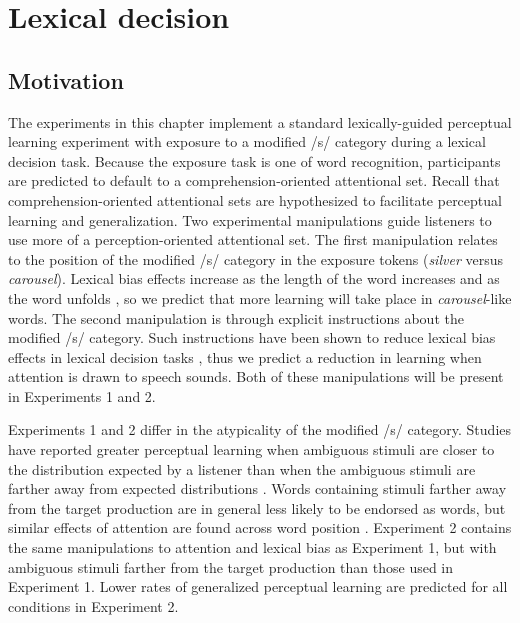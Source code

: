 
\chapter{Lexical decision}
\label{chap:lexdec}

\section{Motivation}

The experiments in this chapter implement a standard lexically-guided perceptual learning experiment with exposure to a modified /s/ category during a lexical decision task.
Because the exposure task is one of word recognition, participants are predicted to default to a comprehension-oriented attentional set.  
Recall that comprehension-oriented attentional sets are hypothesized to facilitate perceptual learning and generalization.
Two experimental manipulations guide listeners to use more of  a perception-oriented attentional set.
The first manipulation relates to the position of the modified /s/ category in the exposure tokens (\emph{silver} versus \emph{carousel}).
Lexical bias effects increase as the length of the word increases and as the word unfolds \citep{Pitt2006, Pitt2012}, so we predict that more learning will take place in \emph{carousel}-like words.
The second manipulation is through explicit instructions about the modified /s/ category.
Such instructions have been shown to reduce lexical bias effects in lexical decision tasks \citep{Pitt2012}, thus we predict a reduction in learning when attention is drawn to speech sounds.
Both of these manipulations will be present in Experiments 1 and 2.

Experiments 1 and 2 differ in the atypicality of the modified /s/ category.
Studies have reported greater perceptual learning when ambiguous stimuli are closer to the distribution expected by a listener than when the ambiguous stimuli are farther away from expected distributions \citep{Sumner2011}.  
Words containing stimuli farther away from the target production are in general less likely to be endorsed as words, but similar effects of attention are found across word position \citep{Pitt2012}.  
Experiment 2 contains the same manipulations to attention and lexical bias as Experiment 1, but with ambiguous stimuli farther from the target production than those used in Experiment 1.
Lower rates of generalized perceptual learning are predicted for all conditions in Experiment 2.

